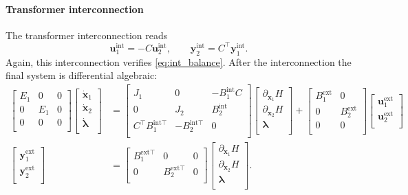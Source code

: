 \paragraph{Transformer interconnection}
The transformer interconnection reads
\begin{equation*}
\bm{u}_1^{\text{int}} = -{C} \bm{u}_2^{\text{int}}, \qquad
\bm{y}_2^{\text{int}} = {C}^\top \bm{y}_1^{\text{int}}.
\end{equation*}
Again, this interconnection verifies \eqref{eq:int_balance}. After the interconnection the final system is differential algebraic:
\begin{align*}
\begin{bmatrix}
E_1 & 0 & 0 \\ 
0 & E_1 & 0 \\
0 & 0 & 0 \\
\end{bmatrix}
\begin{bmatrix}
\dot{\bm{x}}_1 \\ \dot{\bm{x}}_2 \\ \dot{\bm{\lambda}} \\
\end{bmatrix} &= 
\begin{bmatrix}
J_1 & 0 & -B_1^{\text{int}} C \\ 
0 & J_2 & B_2^{\text{int}} \\
C^\top B_1^{\text{int} \top} & - B_2^{\text{int} \top} & 0 \\
\end{bmatrix}
\begin{bmatrix}
\partial_{\bm{x}_1}{H} \\ 
\partial_{\bm{x}_2}{H} \\
\bm{\lambda} \\
\end{bmatrix}+ 
\begin{bmatrix}
B_1^{\text{ext}} & 0 \\ 0 & B_2^{\text{ext}} \\ 0 & 0 \\
\end{bmatrix} 
\begin{bmatrix}
\bm{u}_1^{\text{ext}} \\ 
\bm{u}_2^{\text{ext}} \\
\end{bmatrix} \\
\begin{bmatrix}
\bm{y}_1^{\text{ext}} \\ \bm{y}_2^{\text{ext}} \\
\end{bmatrix}  &= \begin{bmatrix}
B_1^{\text{ext} \top} & 0 & 0 \\
0 & B_2^{\text{ext} \top} & 0 \\
\end{bmatrix} \begin{bmatrix}
\partial_{\bm{x}_1}{H} \\ 
\partial_{\bm{x}_2}{H} \\
\bm{\lambda} \\
\end{bmatrix}.
\end{align*}
